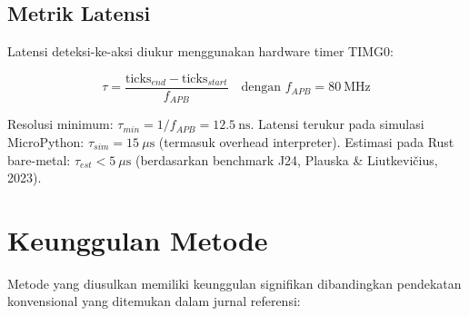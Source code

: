 \documentclass[12pt,a4paper]{article}
\begin{document}
\subsection{Metrik Latensi}

Latensi deteksi-ke-aksi diukur menggunakan hardware timer TIMG0:

\begin{equation}
  \tau = \frac{\text{ticks}_{end} - \text{ticks}_{start}}{f_{APB}} \quad \text{dengan } f_{APB} = 80\ \text{MHz}
\end{equation}

Resolusi minimum: $\tau_{min} = 1/f_{APB} = 12.5\ \text{ns}$. Latensi terukur pada simulasi MicroPython: $\tau_{sim} = 15\ \mu\text{s}$ (termasuk overhead interpreter). Estimasi pada Rust bare-metal: $\tau_{est} < 5\ \mu\text{s}$ (berdasarkan benchmark J24, Plauska \& Liutkevi\v{c}ius, 2023).


\section{Keunggulan Metode}


Metode yang diusulkan memiliki keunggulan signifikan dibandingkan pendekatan konvensional yang ditemukan dalam jurnal referensi:
\end{document}
